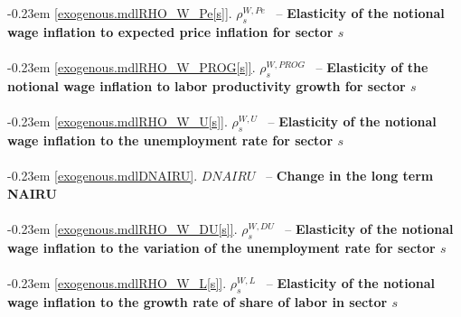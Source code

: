 \documentclass[12pt]{article}
\numberwithin{equation}{section}
\begin{document}
\noindent \kern-0.23em \noindent \begingroup {} \label{exogenous.mdlRHO_W_Pe[s]}\ref{exogenous.mdlRHO_W_Pe[s]}.
         
        \ensuremath{\rho^{W,Pe}_{s}}~ \endgroup -- \noindent \textbf{Elasticity of the notional wage inflation to expected price inflation for sector $s$}  \\ \\[-8pt]


\noindent \kern-0.23em \noindent \begingroup {} \label{exogenous.mdlRHO_W_PROG[s]}\ref{exogenous.mdlRHO_W_PROG[s]}.
         
        \ensuremath{\rho^{W,PROG}_{s}}~ \endgroup -- \noindent \textbf{Elasticity of the notional wage inflation to labor productivity growth for sector $s$}  \\ \\[-8pt]


\noindent \kern-0.23em \noindent \begingroup {} \label{exogenous.mdlRHO_W_U[s]}\ref{exogenous.mdlRHO_W_U[s]}.
         
        \ensuremath{\rho^{W,U}_{s}}~ \endgroup -- \noindent \textbf{Elasticity of the notional wage inflation to the unemployment rate for sector $s$}  \\ \\[-8pt]


\noindent \kern-0.23em \noindent \begingroup {} \label{exogenous.mdlDNAIRU}\ref{exogenous.mdlDNAIRU}.
         
        \ensuremath{DNAIRU}~ \endgroup -- \noindent \textbf{Change in the long term NAIRU}  \\ \\[-8pt]


\noindent \kern-0.23em \noindent \begingroup {} \label{exogenous.mdlRHO_W_DU[s]}\ref{exogenous.mdlRHO_W_DU[s]}.
         
        \ensuremath{\rho^{W,DU}_{s}}~ \endgroup -- \noindent \textbf{Elasticity of the notional wage inflation to the variation of the unemployment rate for sector $s$}  \\ \\[-8pt]


\noindent \kern-0.23em \noindent \begingroup {} \label{exogenous.mdlRHO_W_L[s]}\ref{exogenous.mdlRHO_W_L[s]}.
         
        \ensuremath{\rho^{W,L}_{s}}~ \endgroup -- \noindent \textbf{Elasticity of the notional wage inflation to the growth rate of share of labor in sector $s$}  \\ \\[-8pt]
\end{document}
